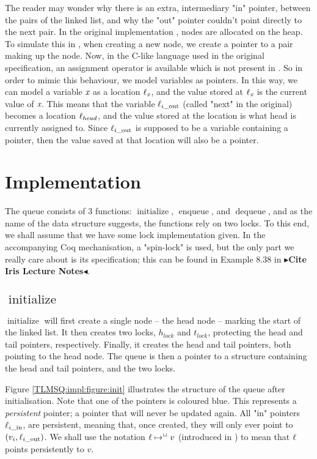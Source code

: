 \documentclass[a4paper, 11pt]{report}
\newcommand{\initialise}{\operatorname{initialize}}
\newcommand{\enqueue}{\operatorname{enqueue}}
\newcommand{\dequeue}{\operatorname{dequeue}}
\newcommand{\locin}[1]{\loc_{#1\_\text{in}}}
\newcommand{\locout}[1]{\loc_{#1\_\text{out}}}
\newcommand{\Hlock}{h_{lock}}
\newcommand{\Tlock}{t_{lock}}
\newcommand{\todo}[1]{{\color[rgb]{.5,0,0}\textbf{$\blacktriangleright$#1$\blacktriangleleft$}}}
\begin{document}
The reader may wonder why there is an extra, intermediary "in" pointer, between the pairs of the linked list, and why the "out" pointer couldn't point directly to the next pair. In the original implementation \cite{DBLP:conf/podc/MichaelS96}, nodes are allocated on the heap. To simulate this in \heaplang, when creating a new node, we create a pointer to a pair making up the node. Now, in the C-like language used in the original specification, an assignment operator is available which is not present in \heaplang. So in order to mimic this behaviour, we model variables as pointers. In this way, we can model a variable $\textit{x}$ as a location $\ell_{\textit{x}}$, and the value stored at $\ell_{\textit{x}}$ is the current value of $\textit{x}$. This means that the variable $\locout{i}$ (called "next" in the original) becomes a location $\ell_{head}$, and the value stored at the location is what head is currently assigned to. Since $\locout{i}$ is supposed to be a variable containing a pointer, then the value saved at that location will also be a pointer.


\section{Implementation}
\label{TLMSQ:section:implementation}

The queue consists of 3 functions: $\initialise$, $\enqueue$, and $\dequeue$, and as the name of the data structure suggests, the functions rely on two locks. To this end, we shall assume that we have some lock implementation given. In the accompanying Coq mechanisation, a "spin-lock" is used, but the only part we really care about is its specification; this can be found in Example 8.38 in \todo{Cite Iris Lecture Notes}.

\subsection[Initialise]{$\initialise$}

$\initialise$ will first create a single node -- the head node -- marking the start of the linked list. It then creates two locks, $\Hlock$ and $\Tlock$, protecting the head and tail pointers, respectively. Finally, it creates the head and tail pointers, both pointing to the head node. The queue is then a pointer to a structure containing the head and tail pointers, and the two locks.

Figure \ref{TLMSQ:impl:figure:init} illustrates the structure of the queue after initialisation. Note that one of the pointers is coloured blue. This represents a \emph{persistent} pointer; a pointer that will never be updated again. All "in" pointers $\locin{i}$, are persistent, meaning that, once created, they will only ever point to $(v_i, \locout{i})$. We shall use the notation $\ell \mapsto^{\mathop{\Box}} v$ (introduced in \cite{DBLP:conf/cpp/VindumB21}) to mean that $\ell$ points persistently to $v$.
\end{document}
